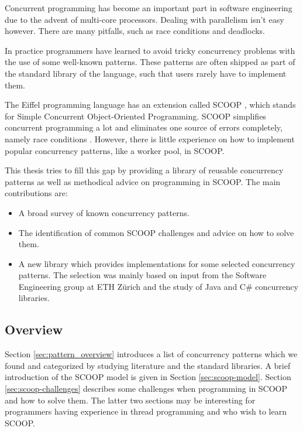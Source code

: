 \documentclass[a4paper,10pt,titlepage]{article}
\begin{document}
Concurrent programming has become an important part in software engineering due to the advent of multi-core processors.
Dealing with parallelism isn't easy however.
There are many pitfalls, such as race conditions and deadlocks.

In practice programmers have learned to avoid tricky concurrency problems with the use of some well-known patterns.
These patterns are often shipped as part of the standard library of the language, such that users rarely have to implement them.

The Eiffel programming language \cite{web:ecma-eiffel}\cite{book:touchofclass} has an extension called SCOOP \cite{Nienaltowski07}\cite{web:scoop},
which stands for Simple Concurrent Object-Oriented Programming.
SCOOP simplifies concurrent programming a lot and eliminates one source of errors completely, namely race conditions \cite{Nienaltowski07}.
However, there is little experience on how to implement popular concurrency patterns, like a worker pool, in SCOOP.

This thesis tries to fill this gap by providing a library of reusable concurrency patterns as well as methodical advice on programming in SCOOP.
The main contributions are:
\begin{itemize}
 \item A broad survey of known concurrency patterns.
 \item The identification of common SCOOP challenges and advice on how to solve them.
 \item A new library which provides implementations for some selected concurrency patterns.
 The selection was mainly based on input from the Software Engineering group at ETH Zürich and the study of Java \cite{web:java-concurrency} and C\# \cite{web:ms-tpl} concurrency libraries.
\end{itemize}

\subsection{Overview}

Section \ref{sec:pattern_overview} introduces a list of concurrency patterns which we found and categorized by studying literature and the standard libraries.
A brief introduction of the SCOOP model is given in Section \ref{sec:scoop-model}.
Section \ref{sec:scoop-challenges} describes some challenges when programming in SCOOP and how to solve them.
The latter two sections may be interesting for programmers having experience in thread programming and who wish to learn SCOOP.
\end{document}
